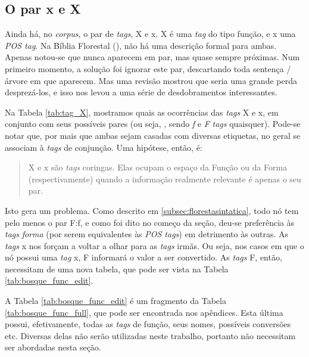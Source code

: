 \subsection{O par \textbf{x} e \textbf{X}}
\label{subsec:sec_x}
Ainda há, no \textit{corpus}, o par de \textit{tags}, X e x. X é uma \textit{tag} do tipo função, e x uma \textit{POS tag}. Na Bíblia Florestal (), não há uma descrição formal para ambas. Apenas notou-se que nunca aparecem em par, mas quase sempre próximas. Num primeiro momento, a solução foi ignorar este par, descartando toda sentença / árvore em que aparecem. Mas uma revisão mostrou que seria uma grande perda desprezá-los, e isso nos levou a uma série de desdobramentos interessantes.
\begin{center}
    
\end{center}
Na Tabela \ref{tab:tag_X}, mostramos quais as ocorrências das \textit{tags} X e x, em conjunto com seus possíveis pares (ou seja, , sendo \textit{f} e \textit{F} \textit{tags} quaisquer). Pode-se notar que, por mais que ambas sejam casadas com diversas etiquetas, no geral se associam à \textit{tags} de conjunção. Uma hipótese, então, é:
\begin{quote}
	X e x são \textit{tags} coringas. Elas ocupam o espaço da Função ou da Forma (respectivamente) quando a informação realmente relevante é apenas o seu par. 
\end{quote}
Isto gera um problema. Como descrito em \ref{subsec:florestasintatica}, todo nó tem pelo menos o par F:f, e como foi dito no começo da seção, deu-se preferência às \textit{tags} \textit{forma} (por serem equivalentes às \textit{POS tags}) em detrimento às outras. As \textit{tags} x nos forçam a voltar a olhar para as \textit{tags} irmãs. Ou seja, nos casos em que o nó possui uma \textit{tag} x, F informará o valor a ser convertido. As \textit{tags} F, então, necessitam de uma nova tabela, que pode ser vista na Tabela \ref{tab:bosque_func_edit}.
\begin{center}
    
\end{center}
A Tabela \ref{tab:bosque_func_edit} é um fragmento da Tabela \ref{tab:bosque_func_full}, que pode ser encontrada nos apêndices. Esta última possui, efetivamente, todas as \textit{tags} de função, seus nomes, possíveis conversões etc. Diversas delas não serão utilizadas neste trabalho, portanto não necessitam ser abordadas nesta seção.

